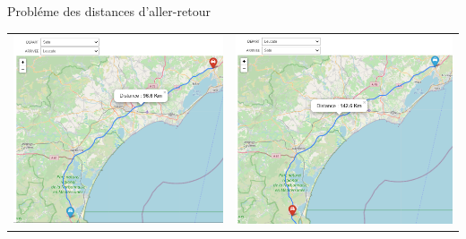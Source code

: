 \documentclass{beamer}
\begin{document}
\begin{frame}{Probléme des distances d'aller-retour}

    \begin{center}
        \begin{tabular}{c c}
                \includegraphics[scale = 0.2]{map prob 1.png} & \includegraphics[scale = 0.2]{map prob 2.png} \\
        \end{tabular}
    \end{center}
    
\end{frame}
\end{document}
